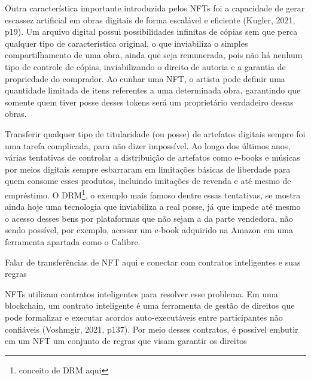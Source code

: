 Outra característica importante introduzida pelos NFTs foi a capacidade de gerar escassez artificial em obras digitais de forma escalável e eficiente (Kugler, 2021, p19). Um arquivo digital possui possibilidades infinitas de cópias sem que perca qualquer tipo de característica original, o que inviabiliza o simples compartilhamento de uma obra, ainda que seja remunerada, pois não há nenhum tipo de controle de cópias, inviabilizando o direito de autoria e a garantia de propriedade do comprador. Ao cunhar uma NFT, o artista pode definir uma quantidade limitada de itens referentes a uma determinada obra, garantindo que somente quem tiver posse desses tokens será um proprietário verdadeiro dessas obras. 

Transferir qualquer tipo de titularidade (ou posse) de artefatos digitais sempre foi uma tarefa complicada, para não dizer impossível. Ao longo dos últimos anos, várias tentativas de controlar a distribuição de artefatos como e-books e músicas por meios digitais sempre esbarraram em limitações básicas de liberdade para quem consome esses produtos, incluindo imitações de revenda e até mesmo de empréstimo. O DRM\footnote{conceito de DRM aqui}, o exemplo mais famoso dentre essas tentativas, se mostra ainda hoje uma tecnologia que inviabiliza a real posse, já que impede até mesmo o acesso desses bens por plataformas que não sejam a da parte vendedora, não sendo possível, por exemplo, acessar um e-book adquirido na Amazon em uma ferramenta apartada como o Calibre.

Falar de transferências de NFT aqui e conectar com contratos inteligentes e suas regras

NFTs utilizam contratos inteligentes para resolver esse problema. Em uma blockchain, um contrato inteligente é uma ferramenta de gestão de direitos que pode formalizar e executar acordos auto-executáveis entre participantes não confiáveis (Voshmgir, 2021, p137). Por meio desses contratos, é possível embutir em um NFT um conjunto de regras que visam garantir os direitos 













